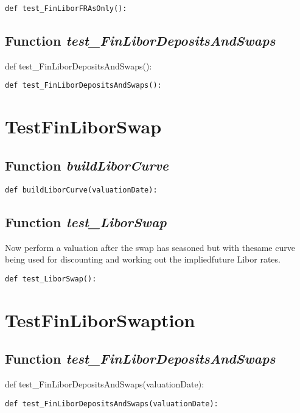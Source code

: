 \documentclass[twoside,11pt]{book}
\begin{document}
\begin{lstlisting}
def test_FinLiborFRAsOnly():
\end{lstlisting}

\subsection{Function {\it test\_FinLiborDepositsAndSwaps}}
def test\_FinLiborDepositsAndSwaps():

\begin{lstlisting}
def test_FinLiborDepositsAndSwaps():
\end{lstlisting}


\newpage
\section{TestFinLiborSwap}

\subsection{Function {\it buildLiborCurve}}


\begin{lstlisting}
def buildLiborCurve(valuationDate):
\end{lstlisting}

\subsection{Function {\it test\_LiborSwap}}
Now perform a valuation after the swap has seasoned but with thesame curve being used for discounting and working out the impliedfuture Libor rates. 

\begin{lstlisting}
def test_LiborSwap():
\end{lstlisting}


\newpage
\section{TestFinLiborSwaption}

\subsection{Function {\it test\_FinLiborDepositsAndSwaps}}
def test\_FinLiborDepositsAndSwaps(valuationDate):

\begin{lstlisting}
def test_FinLiborDepositsAndSwaps(valuationDate):
\end{lstlisting}
\end{document}

